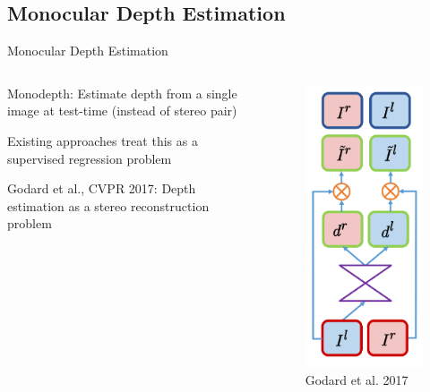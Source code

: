\documentclass[11pt]{beamer}
\newenvironment{wideitemize}{\itemize\addtolength{\itemsep}{.75em}}{\enditemize}
\begin{document}
\subsection{Monocular Depth Estimation}
\label{sec:org3a87c71}
\begin{frame}[c]{Monocular Depth Estimation}

    \begin{columns}
        \begin{column}{0.6\textwidth}
        \begin{wideitemize}
        \item Monodepth: Estimate depth from a single image at test-time (instead of stereo pair)
        \item Existing approaches treat this as a supervised regression problem
        \item Godard et al., CVPR 2017: Depth estimation as a stereo reconstruction problem
        \end{wideitemize}
        \end{column}
        \begin{column}{0.4\textwidth}
        \centering
          \begin{figure}
          \includegraphics[height=.75\textheight]{figures/monodepth.png}
          \caption{Godard et al. 2017}
          \end{figure}
        \end{column}
        

\end{columns}
\end{frame}
\end{document}
